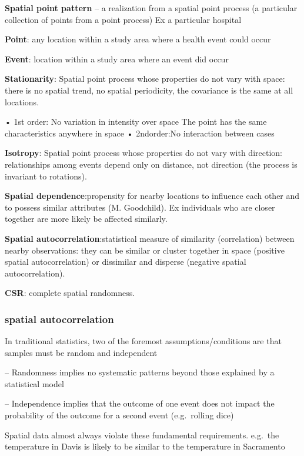 \documentclass[
]{article}
\begin{document}
\textbf{Spatial point pattern} -- a realization from a spatial point
process (a particular collection of points from a point process) Ex a
particular hospital

\textbf{Point}: any location within a study area where a health event
could occur

\textbf{Event}: location within a study area where an event did occur

\textbf{Stationarity}: Spatial point process whose properties do not
vary with space: there is no spatial trend, no spatial periodicity, the
covariance is the same at all locations.

• 1st order: No variation in intensity over space The point has the same
characteristics anywhere in space • 2ndorder:No interaction between
cases

\textbf{Isotropy}: Spatial point process whose properties do not vary
with direction: relationships among events depend only on distance, not
direction (the process is invariant to rotations).

\textbf{Spatial dependence}:propensity for nearby locations to influence
each other and to possess similar attributes (M. Goodchild). Ex
individuals who are closer together are more likely be affected
similarly.

\textbf{Spatial autocorrelation}:statistical measure of similarity
(correlation) between nearby observations: they can be similar or
cluster together in space (positive spatial autocorrelation) or
dissimilar and disperse (negative spatial autocorrelation).

\textbf{CSR}: complete spatial randomness.

\hypertarget{spatial-autocorrelation}{%
\subsubsection{spatial autocorrelation}\label{spatial-autocorrelation}}

In traditional statistics, two of the foremost assumptions/conditions
are that samples must be random and independent

-- Randomness implies no systematic patterns beyond those explained by a
statistical model

-- Independence implies that the outcome of one event does not impact
the probability of the outcome for a second event (e.g.~rolling dice)

Spatial data almost always violate these fundamental requirements.
e.g.~the temperature in Davis is likely to be similar to the temperature
in Sacramento
\end{document}
